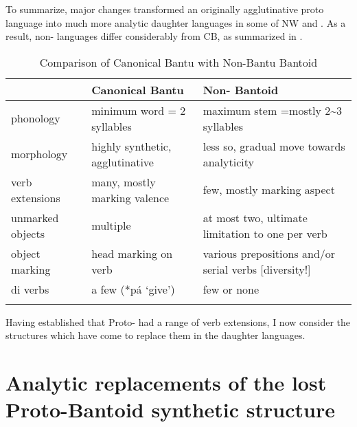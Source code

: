 \documentclass[output=paper]{langsci/langscibook}
\begin{document}
 \z 
\z 
  
  
  To summarize, major changes transformed an originally agglutinative proto language into much more analytic daughter languages in some of NW  and . As a result, non-  languages differ considerably from CB, as summarized in .

\begin{table}
\caption{Comparison of Canonical Bantu with Non-Bantu Bantoid}
\label{tab:hyman:ex12}
\begin{tabularx}{\textwidth}{lQQ}
\lsptoprule
 & {Canonical Bantu} & {Non- Bantoid}\\
\midrule
{phonology} & minimum word = 2 syllables & maximum stem =mostly 2{\textasciitilde}3 syllables\\
\tablevspace
{morphology} & highly synthetic, agglutinative & less so, gradual move towards analyticity\\
\tablevspace
{verb extensions} & many, mostly marking valence & few, mostly marking aspect\\
\tablevspace
{unmarked objects} & multiple & at most two, ultimate limitation to one per verb\\
\tablevspace
{object marking} & head marking on verb & various prepositions and/or serial verbs [diversity!]\\
\tablevspace
{di verbs} & a few (*pá ‘give’) & few or none\\
\lspbottomrule
\end{tabularx}
\end{table}
\noindent
Having established that Proto- had a range of verb extensions, I now consider the structures which have come to replace them in the daughter languages.

\section{Analytic replacements of the lost Proto-Bantoid synthetic structure}\label{sec:hyman:2}
\end{document}
